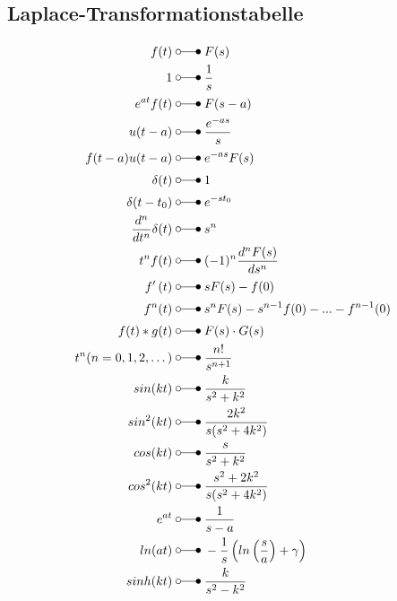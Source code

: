 \subsection{Laplace-Transformationstabelle}
\begin{align*}
    f(t)                            \;&\laplace\; F(s) \\
    1                               \;&\laplace\; \frac{1}{s} \\
    e^{at}f(t)                      \;&\laplace\; F(s-a) \\
    u(t-a)                          \;&\laplace\; \frac{e^{-as}}{s} \\
    f(t-a)u(t-a)                    \;&\laplace\; e^{-as}F(s) \\
    \delta(t)                       \;&\laplace\; 1\\
    \delta(t-t_{0})                 \;&\laplace\; e^{-st_{0}} \\
    \frac{d^{n}}{dt^{n}}\delta(t)   \;&\laplace\; s^{n}  \\
    t^{n}f(t)                       \;&\laplace\; (-1)^n \frac{d^nF(s)}{ds^n}  \\
    f^{\prime}\left(t\right)        \;&\laplace\; \begin{aligned}sF(s)-f(0)\end{aligned}  \\
    f^{n}(t)                        \;&\laplace\; s^nF(s)-s^{n-1}f(0)-...-f^{n-1}(0)  \\
    f(t)*g(t)                       \;&\laplace\; \begin{aligned}F(s)\cdot G(s)\end{aligned}  \\
    t^{n}(n=0,1,2,\dots)            \;&\laplace\; \frac{n!}{s^{n+1}}  \\
    sin(kt)                         \;&\laplace\; \frac{k}{s^2+k^2}  \\
    sin^{2}(kt)                     \;&\laplace\; \frac{2k^2}{s(s^2+4k^2)}  \\
    cos(kt)                         \;&\laplace\; \frac{s}{s^2+k^2}  \\
    cos^{2}(kt)                     \;&\laplace\; \frac{s^2+2k^2}{s(s^2+4k^2)}  \\
    e^{at}                          \;&\laplace\; \frac{1}{s-a}  \\
    ln(at)                          \;&\laplace\; -\frac{1}{s}\left(ln\left(\frac sa\right)+\gamma\right)  \\
    sinh(kt)                        \;&\laplace\; \frac{k}{s^2-k^2} \\

\end{align*}
